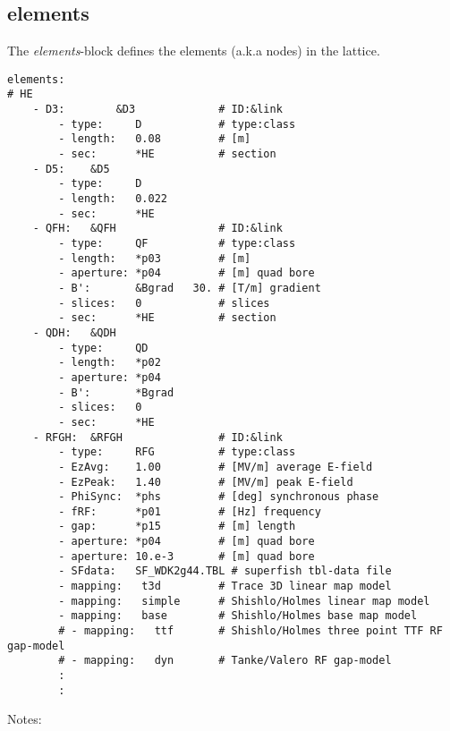 \documentclass[10pt]{article}
\begin{document}
\subsection{elements}
The \emph{elements}-block defines the elements (a.k.a nodes) in the lattice.
\begin{verbatim}
elements:
# HE
    - D3:        &D3             # ID:&link
        - type:     D            # type:class
        - length:   0.08         # [m]
        - sec:      *HE          # section
    - D5:    &D5
        - type:     D
        - length:   0.022
        - sec:      *HE
    - QFH:   &QFH                # ID:&link
        - type:     QF           # type:class
        - length:   *p03         # [m]
        - aperture: *p04         # [m] quad bore
        - B':       &Bgrad   30. # [T/m] gradient
        - slices:   0            # slices
        - sec:      *HE          # section
    - QDH:   &QDH
        - type:     QD
        - length:   *p02
        - aperture: *p04
        - B':       *Bgrad
        - slices:   0
        - sec:      *HE
    - RFGH:  &RFGH               # ID:&link
        - type:     RFG          # type:class
        - EzAvg:    1.00         # [MV/m] average E-field
        - EzPeak:   1.40         # [MV/m] peak E-field
        - PhiSync:  *phs         # [deg] synchronous phase
        - fRF:      *p01         # [Hz] frequency
        - gap:      *p15         # [m] length
        - aperture: *p04         # [m] quad bore
        - aperture: 10.e-3       # [m] quad bore
        - SFdata:   SF_WDK2g44.TBL # superfish tbl-data file
        - mapping:   t3d         # Trace 3D linear map model
        - mapping:   simple      # Shishlo/Holmes linear map model
        - mapping:   base        # Shishlo/Holmes base map model
        # - mapping:   ttf       # Shishlo/Holmes three point TTF RF gap-model
        # - mapping:   dyn       # Tanke/Valero RF gap-model
        :
        :
\end{verbatim}
Notes:
\end{document}

